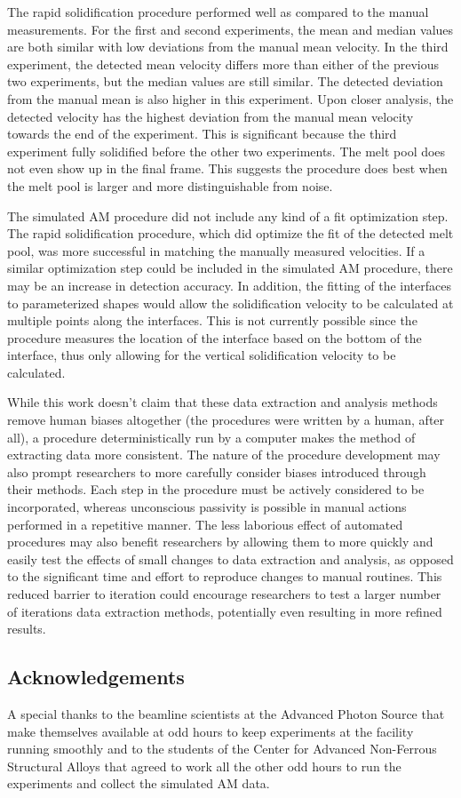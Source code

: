 The rapid solidification procedure performed well as compared to the manual
measurements. For the first and second experiments, the mean and median values
are both similar with low deviations from the manual mean velocity. In the
third experiment, the detected mean velocity differs more than either of the
previous two experiments, but the median values are still similar. The
detected deviation from the manual mean is also higher in this experiment.
Upon closer analysis, the detected velocity has the highest deviation from
the manual mean velocity towards the end of the experiment. This is
significant because the third experiment fully solidified
before the other two experiments. The melt pool does not even show up
in the final frame. This suggests the procedure does best when
the melt pool is larger and more distinguishable from noise.

The simulated AM procedure did not include any kind of a fit optimization step.
The rapid solidification procedure, which did optimize the fit of the detected
melt pool, was more successful in matching the manually measured velocities.
If a similar optimization step could be included in the simulated AM procedure,
there may be an increase in detection accuracy.
In addition, the fitting of the interfaces to parameterized shapes would allow
the solidification velocity to be calculated at multiple points along the
interfaces. This is not currently possible since the procedure
measures the location of the interface based on the bottom of the interface,
thus only allowing for the vertical solidification velocity
to be calculated.

While this work doesn't claim that these data extraction and analysis methods
remove human biases altogether (the procedures were written by a human, after
all), a procedure deterministically run by a computer
makes the method of extracting data more consistent. The nature of the
procedure development may also prompt researchers to more
carefully consider biases introduced through their methods.
Each step in the procedure must be actively considered to be incorporated,
whereas unconscious passivity is possible in manual actions
performed in a repetitive manner.
The less laborious effect of automated procedures may also benefit researchers
by allowing them to more quickly and easily test the effects
of small changes to data extraction and analysis, as opposed to the significant
time and effort to reproduce changes to manual routines. This reduced barrier
to iteration could encourage researchers to test a larger number of iterations
data extraction methods, potentially even resulting in more refined results.

\subsection*{Acknowledgements}
A special thanks to the beamline scientists at the Advanced Photon Source
that make themselves available at odd hours to keep experiments at the
facility running smoothly and to the students of the Center for Advanced
Non-Ferrous Structural Alloys that agreed to work all the other odd hours to
run the experiments and collect the simulated AM data.

